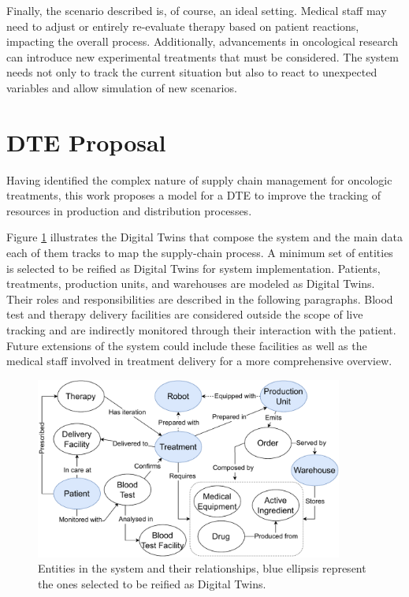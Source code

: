 Finally, the scenario described is, of course, an ideal setting. Medical staff may need to adjust or entirely re-evaluate therapy based on patient reactions, impacting the overall process. Additionally, advancements in oncological research can introduce new experimental treatments that must be considered.
%
The system needs not only to track the current situation but also to react to unexpected variables and allow simulation of new scenarios.

\section{\acl{DTE} Proposal}

Having identified the complex nature of supply chain management for oncologic treatments, this work proposes a model for a \ac{DTE} to improve the tracking of resources in production and distribution processes.

Figure \ref{fig:model} illustrates the Digital Twins that compose the system and the main data each of them tracks to map the supply-chain process.
%
A minimum set of entities is selected to be reified as Digital Twins for system implementation. Patients, treatments, production units, and warehouses are modeled as Digital Twins.
%
Their roles and responsibilities are described in the following paragraphs.
%
Blood test and therapy delivery facilities are considered outside the scope of live tracking and are indirectly monitored through their interaction with the patient.
%
Future extensions of the system could include these facilities as well as the medical staff involved in treatment delivery for a more comprehensive overview.

\begin{figure}[t]
    \centering
    \includegraphics[width=0.9\textwidth]{figures/applications/CompressedDTModel.pdf}
    \caption{Entities in the system and their relationships, blue ellipsis represent the ones selected to be reified as Digital Twins.}
    \label{fig:model}
\end{figure}

